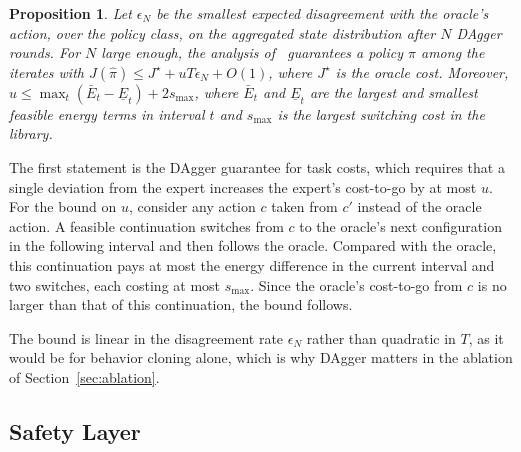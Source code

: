 \documentclass[journal]{IEEEtran}
\newtheorem{proposition}{Proposition}
\begin{document}
\begin{proposition}\label{prop:imitation}
Let $\epsilon_N$ be the smallest expected disagreement with the oracle's action, over the policy class, on the aggregated state distribution after $N$ DAgger rounds. For $N$ large enough, the analysis of~\cite{ross2011dagger} guarantees a policy $\hat{\pi}$ among the iterates with $J(\hat{\pi})\le J^\star+uT\epsilon_N+O(1)$, where $J^\star$ is the oracle cost. Moreover, $u\le\max_t(\bar{E}_t-\underline{E}_t)+2s_{\max}$, where $\bar{E}_t$ and $\underline{E}_t$ are the largest and smallest feasible energy terms in interval $t$ and $s_{\max}$ is the largest switching cost in the library.
\end{proposition}
\begin{IEEEproof}
The first statement is the DAgger guarantee for task costs, which requires that a single deviation from the expert increases the expert's cost-to-go by at most $u$. For the bound on $u$, consider any action $c$ taken from $c'$ instead of the oracle action. A feasible continuation switches from $c$ to the oracle's next configuration in the following interval and then follows the oracle. Compared with the oracle, this continuation pays at most the energy difference in the current interval and two switches, each costing at most $s_{\max}$. Since the oracle's cost-to-go from $c$ is no larger than that of this continuation, the bound follows.
\end{IEEEproof}

The bound is linear in the disagreement rate $\epsilon_N$ rather than quadratic in $T$, as it would be for behavior cloning alone, which is why DAgger matters in the ablation of Section~\ref{sec:ablation}.

\subsection{Safety Layer}
\end{document}
